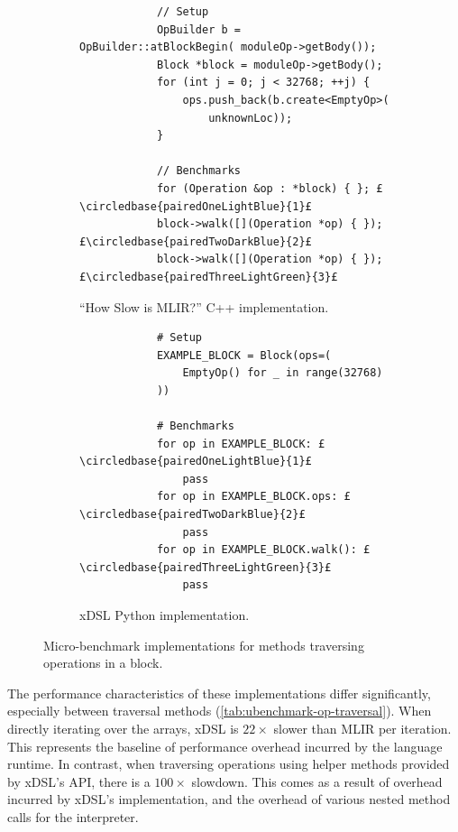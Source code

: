 \begin{figure}[H]
    \centering
    \begin{subfigure}[b]{0.45\textwidth}
       \centering
        \begin{verbatim}
            // Setup
            OpBuilder b = OpBuilder::atBlockBegin( moduleOp->getBody());
            Block *block = moduleOp->getBody();
            for (int j = 0; j < 32768; ++j) {
                ops.push_back(b.create<EmptyOp>(
                    unknownLoc));
            }

            // Benchmarks
            for (Operation &op : *block) { }; £\circledbase{pairedOneLightBlue}{1}£
            block->walk([](Operation *op) { }); £\circledbase{pairedTwoDarkBlue}{2}£
            block->walk([](Operation *op) { }); £\circledbase{pairedThreeLightGreen}{3}£
        \end{verbatim}
        \caption{``How Slow is MLIR?'' C++ implementation.}
        \label{listing:ubenchmark-op-traversal-bench-mlir}
    \end{subfigure}
    \hfill
    \begin{subfigure}[b]{0.45\textwidth}
        \centering
        \begin{verbatim}
            # Setup
            EXAMPLE_BLOCK = Block(ops=(
                EmptyOp() for _ in range(32768)
            ))

            # Benchmarks
            for op in EXAMPLE_BLOCK: £\circledbase{pairedOneLightBlue}{1}£
                pass
            for op in EXAMPLE_BLOCK.ops: £\circledbase{pairedTwoDarkBlue}{2}£
                pass
            for op in EXAMPLE_BLOCK.walk(): £\circledbase{pairedThreeLightGreen}{3}£
                pass
        \end{verbatim}
        \footnotesize\vspace{1em}
        \caption{xDSL Python implementation.}
        \label{listing:ubenchmark-op-traversal-bench-xdsl}
    \end{subfigure}
    \vspace{1em}
    \captionsetup{name=Listing}
    \caption{Micro-benchmark implementations for methods traversing operations in a block.}
    \label{listing:ubenchmark-op-traversal-bench}
\end{figure}


The performance characteristics of these implementations differ significantly, especially between traversal methods (\autoref{tab:ubenchmark-op-traversal}).
When directly iterating over the arrays, xDSL is $22\times$ slower than MLIR per iteration. This represents the baseline of performance overhead incurred by the language runtime. In contrast, when traversing operations using helper methods provided by xDSL's API, there is a $100\times$ slowdown. This comes as a result of overhead incurred by xDSL's implementation, and the overhead of various nested method calls for the interpreter.

